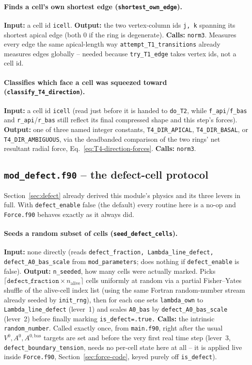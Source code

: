 \documentclass[11pt,a4paper]{report}
\begin{document}
\paragraph{Finds a cell's own shortest edge
(\texttt{shortest\_own\_edge}).} \textbf{Input:} a cell id
\texttt{icell}. \textbf{Output:} the two vertex-column ids \texttt{j,
k} spanning its shortest apical edge (both 0 if the ring is degenerate).
\textbf{Calls:} \texttt{norm3}. Measures every edge the same
apical-length way \texttt{attempt\_T1\_transitions} already measures
edges globally -- needed because \texttt{try\_T1\_edge} takes vertex
ids, not a cell id.
\paragraph{Classifies which face a cell was squeezed toward
(\texttt{classify\_T4\_direction}).} \textbf{Input:} a cell id
\texttt{icell} (read just before it is handed to \texttt{do\_T2}, while
\texttt{f\_api}/\texttt{f\_bas} and \texttt{r\_api}/\texttt{r\_bas}
still reflect its final compressed shape and this step's forces).
\textbf{Output:} one of three named integer constants,
\texttt{T4\_DIR\_APICAL}, \texttt{T4\_DIR\_BASAL}, or
\texttt{T4\_DIR\_AMBIGUOUS}, via the deadbanded comparison of the two
rings' net resultant radial force, Eq.~\ref{eq:T4-direction-forces}.
\textbf{Calls:} \texttt{norm3}.

\subsection{\texttt{mod\_defect.f90} -- the defect-cell protocol}
\label{sec:mod-defect-code}
Section~\ref{sec:defect} already derived this module's physics and its
three levers in full. With \texttt{defect\_enable} false (the default)
every routine here is a no-op and \texttt{Force.f90} behaves exactly as
it always did.
\paragraph{Seeds a random subset of cells (\texttt{seed\_defect\_cells}).}
\textbf{Input:} none directly (reads \texttt{defect\_fraction,
Lambda\_line\_defect, defect\_A0\_bas\_scale} from
\texttt{mod\_parameters}; does nothing if \texttt{defect\_enable} is
false). \textbf{Output:} \texttt{n\_seeded}, how many cells were
actually marked. Picks
$\lceil\texttt{defect\_fraction}\times n_{\mathrm{alive}}\rceil$ cells
uniformly at random via a partial Fisher--Yates shuffle of the
alive-cell index list (using the same Fortran random-number stream
already seeded by \texttt{init\_rng}), then for each one sets
\texttt{lambda\_own} to \texttt{Lambda\_line\_defect} (lever~1) and
scales \texttt{A0\_bas} by \texttt{defect\_A0\_bas\_scale} (lever~2)
before finally marking \texttt{is\_defect=.true.} \textbf{Calls:} the
intrinsic \texttt{random\_number}. Called exactly once, from
\texttt{main.f90}, right after the usual $V^0,A^0,A^{0,\mathrm{bas}}$
targets are set and before the very first real time step (lever~3,
\texttt{defect\_boundary\_tension}, needs no per-cell state here at
all -- it is applied live inside \texttt{Force.f90},
Section~\ref{sec:force-code}, keyed purely off \texttt{is\_defect}).
\end{document}
